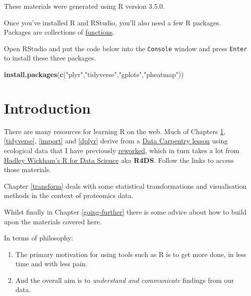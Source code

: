 \documentclass[12pt,]{book}
\newenvironment{Shaded}{\begin{snugshade}}{\end{snugshade}}
\newcommand{\KeywordTok}[1]{\textcolor[rgb]{0.13,0.29,0.53}{\textbf{#1}}}
\newcommand{\StringTok}[1]{\textcolor[rgb]{0.31,0.60,0.02}{#1}}
\newcommand{\NormalTok}[1]{#1}
\theoremstyle{definition}
\theoremstyle{definition}
\theoremstyle{definition}
\theoremstyle{remark}
\begin{document}
These materials were generated using R version 3.5.0.

Once you've installed R and RStudio, you'll also need a few R packages.
Packages are collections of
\protect\hyperlink{function-anatomy}{functions}.

Open RStudio and put the code below into the \texttt{Console} window and
press \texttt{Enter} to install these three packages.

\begin{Shaded}
\begin{Highlighting}[]
\KeywordTok{install.packages}\NormalTok{(}\KeywordTok{c}\NormalTok{(}\StringTok{"plyr"}\NormalTok{,}\StringTok{"tidyverse"}\NormalTok{,}\StringTok{"gplots"}\NormalTok{,}\StringTok{"pheatmap"}\NormalTok{))}
\end{Highlighting}
\end{Shaded}

\chapter{Introduction}\label{intro}

There are many resources for learning R on the web. Much of Chapters
\ref{intro}, \ref{tidyverse}, \ref{import} and \ref{dplyr} derive from a
\href{http://www.datacarpentry.org/lessons/}{Data Carpentry lesson}
using ecological data that I have previously
\href{https://southampton-rsg.github.io/2017-08-01-southampton-dc/novice/R-ecology-lesson/index.html}{reworked},
which in turn takes a lot from \href{http://r4ds.had.co.nz/}{Hadley
Wickham's R for Data Science} aka \textbf{R4DS}. Follow the links to
access those materials.

Chapter \ref{transform} deals with some statistical transformations and
visualisation methods in the context of proteomics data.

Whilst finally in Chapter \ref{going-further} there is some advice about
how to build upon the materials covered here.

In terms of philosophy:

\begin{enumerate}
\def\labelenumi{\arabic{enumi}.}
\item
  The primary motivation for using tools such as R is to get more done,
  in less time and with less pain.
\item
  And the overall aim is to \emph{understand and communicate} findings
  from our data.
\end{enumerate}
\end{document}
